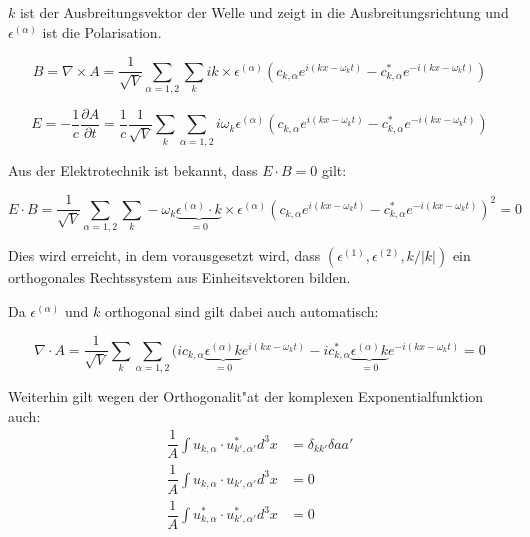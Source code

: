 $k$ ist der Ausbreitungsvektor der Welle und zeigt in die Ausbreitungsrichtung und $\epsilon^{(\alpha)}$ ist die Polarisation. 

\begin{equation}
B = \nabla \times A = \frac{1}{ \sqrt{V}} \sum_{\alpha=1,2}  \sum_k ik \times \epsilon^{(\alpha)} (c_{k,\alpha} e^{i (kx - \omega_k t)} - c^*_{k,\alpha} e^{-i(kx - \omega_k t)})
\end{equation}

\begin{equation}
E = -\frac{1}{c} \frac{\partial A}{\partial t} = \frac{1}{c} \frac{1}{\sqrt{V}} \sum_k \sum_{\alpha=1,2} i \omega_k \epsilon^{(\alpha)} (c_{k,\alpha} e^{i (kx - \omega_k t)} - c^*_{k,\alpha} e^{-i(kx - \omega_k t)})
\end{equation}

Aus der Elektrotechnik ist bekannt, dass $E \cdot B = 0$ gilt:

\begin{equation}
E \cdot B = \frac{1}{\sqrt{V}} \sum_{\alpha=1,2}   \sum_k -\omega_k \underbrace{\epsilon^{(\alpha)} \cdot k}_{=0} \times \epsilon^{(\alpha)} (c_{k,\alpha} e^{i (kx - \omega_k t)} - c^*_{k,\alpha} e^{-i(kx - \omega_k t)})^2 = 0
\end{equation}

Dies wird erreicht, in dem vorausgesetzt wird, dass $(\epsilon^{(1)}, \epsilon^{(2)} , k/|k|)$ ein orthogonales Rechtssystem aus Einheitsvektoren bilden.

Da $\epsilon^{(\alpha)}$ und $k$ orthogonal sind gilt dabei auch automatisch:

\begin{equation}
\nabla \cdot A = \frac{1}{\sqrt{V}} \sum_k \sum_{\alpha=1,2} (i c_{k,\alpha} \underbrace{\epsilon^{(\alpha)} k}_{=0} e^{i (kx - \omega_k t)} - i c^*_{k,\alpha} \underbrace{\epsilon^{(\alpha)} k}_{=0} e^{-i(kx - \omega_k t)} = 0
\end{equation}

Weiterhin gilt wegen der Orthogonalit"at der komplexen Exponentialfunktion auch:
\begin{equation}
\begin{split}
\dfrac{1}{A} \int u_{k,\alpha} \cdot u^*_{k',\alpha'} d^3 x &= \delta_{kk'}\delta{aa'} \\
\dfrac{1}{A} \int u_{k,\alpha} \cdot u_{k',\alpha'} d^3 x &= 0 \\
\dfrac{1}{A} \int u^*_{k,\alpha} \cdot u^*_{k',\alpha'} d^3 x &= 0
\end{split}
\end{equation}

